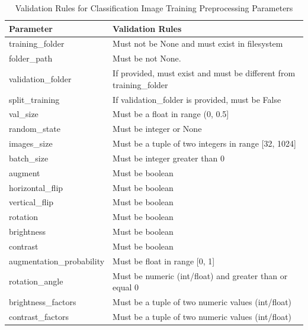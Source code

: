 \begin{table}[H]
\centering
\small
\renewcommand{\arraystretch}{1.15}
\setlength{\tabcolsep}{4pt}
\begin{tabular}{ll}
\toprule
\textbf{Parameter} & \textbf{Validation Rules} \\
\midrule

training\_folder &
Must not be None and must exist in filesystem \\
folder\_path& Must be not None.\\
validation\_folder &
If provided, must exist and must be different from training\_folder \\

split\_training &
If validation\_folder is provided, must be False \\

val\_size &
Must be a float in range (0, 0.5] \\

random\_state &
Must be integer or None \\

images\_size &
Must be a tuple of two integers in range [32, 1024] \\

batch\_size &
Must be integer greater than 0 \\

augment &
Must be boolean \\

horizontal\_flip &
Must be boolean \\

vertical\_flip &
Must be boolean \\

rotation &
Must be boolean \\

brightness &
Must be boolean \\

contrast &
Must be boolean \\

augmentation\_probability &
Must be float in range [0, 1] \\

rotation\_angle &
Must be numeric (int/float) and greater than or equal 0 \\

brightness\_factors &
Must be a tuple of two numeric values (int/float) \\

contrast\_factors &
Must be a tuple of two numeric values (int/float) \\

\bottomrule
\end{tabular}
\caption{Validation Rules for Classification Image Training Preprocessing Parameters}
\end{table}


